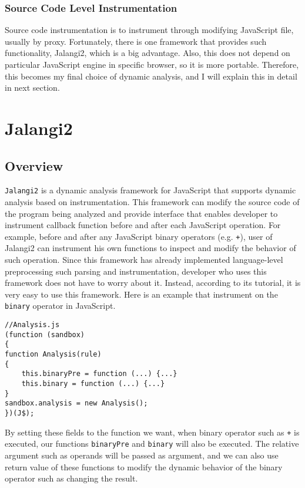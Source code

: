 \subsubsection{Source Code Level Instrumentation}

Source code instrumentation is to instrument through modifying JavaScript file, usually by proxy. Fortunately, there is one framework that provides such functionality, Jalangi2, which is a big advantage. Also, this does not depend on particular JavaScript engine in specific browser, so it is more portable. Therefore, this becomes my final choice of dynamic analysis, and I will explain this in detail in next section.

\section{Jalangi2}

\subsection{Overview}

\texttt{Jalangi2}\citep{jalangi2} is a dynamic analysis framework for JavaScript that supports dynamic analysis based on instrumentation. This framework can modify the source code of the program being analyzed and provide interface that enables developer to instrument callback function before and after each JavaScript operation. For example, before and after any JavaScript binary operators (e.g. \texttt{+}), user of Jalangi2 can instrument his own functions to inspect and modify the behavior of such operation. Since this framework has already implemented language-level preprocessing such parsing and instrumentation, developer who uses this framework does not have to worry about it. Instead, according to its tutorial\citep{jalangi2tut}, it is very easy to use this framework. Here is an example that instrument on the \texttt{binary} operator in JavaScript.

\begin{verbatim}
//Analysis.js
(function (sandbox)
{
function Analysis(rule)
{
    this.binaryPre = function (...) {...}
    this.binary = function (...) {...}
}
sandbox.analysis = new Analysis();
})(J$);
\end{verbatim}


By setting these fields to the function we want, when binary operator such as \texttt{+} is executed, our functions \texttt{binaryPre} and \texttt{binary} will also be executed. The relative argument such as operands will be passed as argument, and we can also use return value of these functions to modify the dynamic behavior of the binary operator such as changing the result. 

